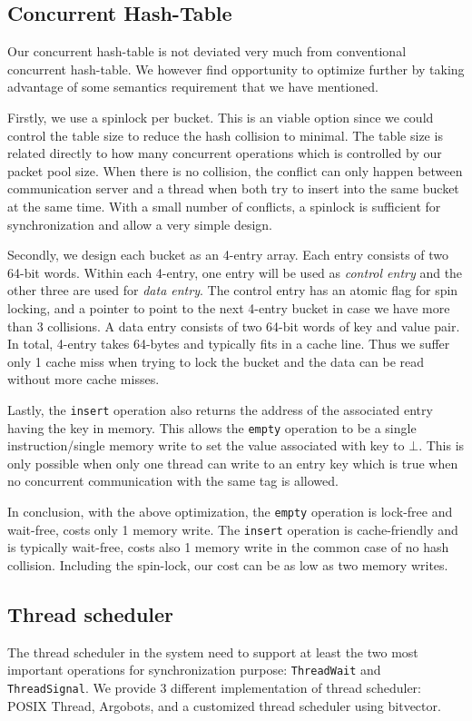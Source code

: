 \subsection{Concurrent Hash-Table}
Our concurrent hash-table is not deviated very much from conventional
concurrent hash-table. We however find opportunity to optimize further by taking 
advantage of some semantics requirement that we have mentioned.

Firstly, we use a spinlock per bucket. This is an viable option since we could
control the table size to reduce the hash collision to minimal. The table size is
related directly to how many concurrent operations which is controlled by 
our packet pool size. When there is no collision, the conflict can only happen
between communication server and a thread when both try to insert into the same
bucket at the same time. With a small number of conflicts, a spinlock is
sufficient for synchronization and allow a very simple design.

Secondly, we design each bucket as an 4-entry array. Each entry consists of two
64-bit words. Within each 4-entry, one entry will be used as \textit{control
entry} and the other three are used for \textit{data entry}. The control entry
has an atomic flag for spin locking, and a pointer to point to the next 4-entry
bucket in case we have more than 3 collisions. A data entry consists of two
64-bit words of key and value pair. In total, 4-entry takes 64-bytes and
typically fits in a cache line. Thus we suffer only 1 cache miss when trying to
lock the bucket and the data can be read without more cache misses.

Lastly, the \texttt{insert} operation also returns the address of the
associated entry having the key in memory. This allows the \texttt{empty}
operation to be a single instruction/single memory write to set the value
associated with key to $\bot$. This is only possible when only one thread can
write to an entry key which is true when no concurrent communication with the
same tag is allowed.

In conclusion, with the above optimization, the \texttt{empty} operation is
lock-free and wait-free, costs only 1 memory write. The \texttt{insert}
operation is cache-friendly and is typically wait-free, costs also 1 memory
write in the common case of no hash collision. Including the spin-lock,
our cost can be as low as two memory writes.

\subsection{Thread scheduler}
The thread scheduler in the system need to support at least  the two most
important operations for synchronization purpose: \texttt{ThreadWait} and
\texttt{ThreadSignal}. We provide 3 different implementation of thread
scheduler: POSIX Thread, Argobots, and a customized thread scheduler using
bitvector.

